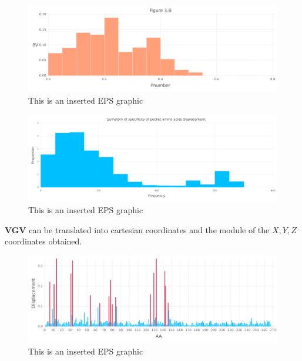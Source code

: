 \documentclass[10pt,letterpaper]{article}
\begin{document}
\begin{figure}[ht]
\begin{center}
\includegraphics[scale=0.5]{1xkk/3bfigure_very_hi-precision.pdf}
\caption{This is an inserted EPS graphic}
\label{fig10}
\end{center}
\end{figure}

\begin{figure}[ht]
\begin{center}
\includegraphics[scale=0.5]{1xkk/3bbfigure_very_hi-precision.pdf}
\caption{This is an inserted EPS graphic}
\label{fig11}
\end{center}
\end{figure}

\FloatBarrier


\textbf{VGV} can be translated into cartesian coordinates and the module of the \(X, Y, Z\) coordinates obtained.

\begin{figure}[ht]
\begin{center}
\includegraphics[scale=0.5]{1xkk/5figure_very_hi-precision.pdf}
\caption{This is an inserted EPS graphic}
\label{fig13}
\end{center}
\end{figure}
\end{document}
